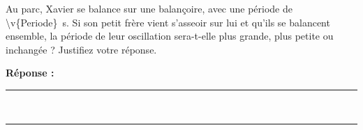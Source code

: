 Au parc, Xavier se balance sur une balançoire, avec une période de \qty{\v{Periode}}{s}. Si son petit frère vient s’asseoir sur lui et qu’ils se balancent ensemble, la période de leur oscillation sera-t-elle plus grande, plus petite ou inchangée ? Justifiez votre réponse.

\noindent\textbf{Réponse :} \hrulefill \\[2.5ex]
\rule{\linewidth}{0.4pt} \\[2.5ex]
\rule{\linewidth}{0.4pt}
\vfill